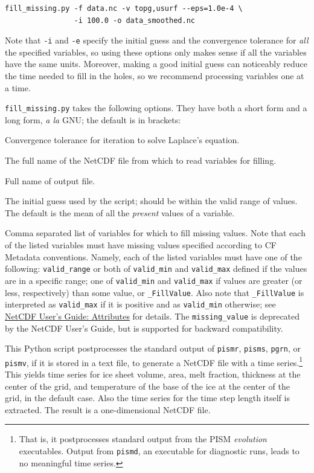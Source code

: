 \documentclass[11pt,final]{amsart}
\newcommand{\und}{\_\!\_}
\begin{document}
\begin{verbatim}
fill_missing.py -f data.nc -v topg,usurf --eps=1.0e-4 \
                -i 100.0 -o data_smoothed.nc
\end{verbatim}
Note that \verb|-i| and \verb|-e| specify the initial guess and the convergence tolerance for \emph{all} the specified variables, so using these options only makes sense if all the variables have the same units. Moreover, making a good initial guess can noticeably reduce the time needed to fill in the holes, so we recommend processing variables one at a time.

\opthead  \verb|fill_missing.py| takes the following options.  They have both a short form and a long form, \emph{a la} GNU; the default is in brackets:

  Convergence tolerance for iteration to solve Laplace's equation.

  The full name of the NetCDF file from which to read variables for filling.

\scriptoptdef{o}{out\und file}{no default}  Full name of output file.

\scriptoptdef{i}{initial\und guess}{'mean'}  The initial guess used by the script; should be within the valid range of values. The default is the mean of all the \emph{present} values of a variable.

  Comma separated list of variables for which to fill missing values.  Note that each of the listed variables must have missing values specified according to CF Metadata conventions. Namely, each of the listed variables must have one of the following: \verb|valid_range| or both of \verb|valid_min| and \verb|valid_max| defined if the values are in a specific range; one of \verb|valid_min| and \verb|valid_max| if values are greater (or less, respectively) than some value, or \verb|_FillValue|. Also note that \verb|_FillValue| is interpreted as \verb|valid_max| if it is positive and as \verb|valid_min| otherwise; see \href{http://www.unidata.ucar.edu/software/netcdf/guide_10.html#SEC76}{NetCDF User's Guide: Attributes} for details. The \verb|missing_value| is deprecated by the NetCDF User's Guide, but is supported for backward compatibility.


  This Python script postprocesses the standard output of \verb|pismr|, \verb|pisms|, \verb|pgrn|, or \verb|pismv|, if it is stored in a text file, to generate a NetCDF file with a time series.\footnote{That is, it postprocesses standard output from the PISM \emph{evolution} executables.  Output from \texttt{pismd}, an executable for diagnostic runs, leads to no meaningful time series.}  This yields time series for ice sheet volume, area, melt fraction, thickness at the center of the grid, and temperature of the base of the ice at the center of the grid, in the default case.  Also the time series for the time step length itself is extracted.  The result is a one-dimensional NetCDF file.
\end{document}
